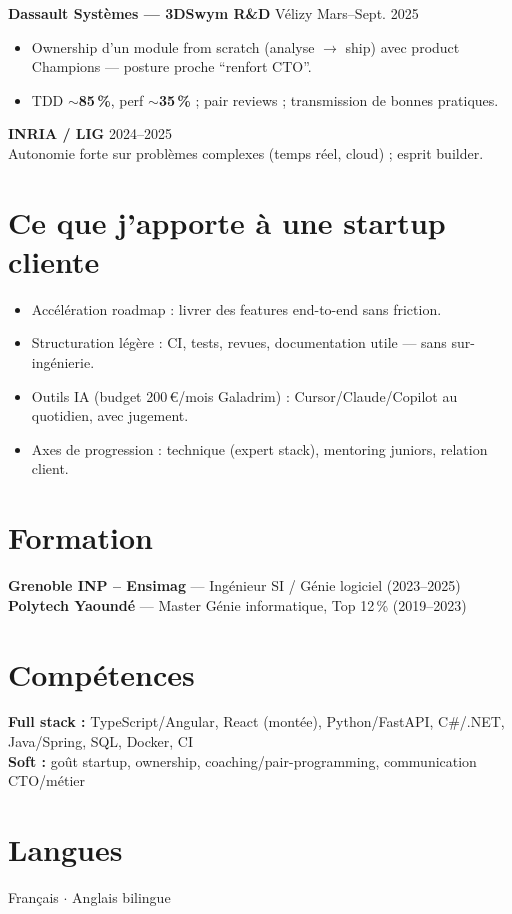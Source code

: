\documentclass[10pt,a4paper]{article}
\begin{document}
\textbf{Dassault Syst\`emes --- 3DSwym R\&D} \hfill V\'elizy \hfill Mars--Sept. 2025
\begin{itemize}
  \item Ownership d'un module from scratch (analyse $\rightarrow$ ship) avec product Champions --- posture proche ``renfort CTO''.
  \item TDD $\sim$\textbf{85\,\%}, perf $\sim$\textbf{35\,\%} ; pair reviews ; transmission de bonnes pratiques.
\end{itemize}

\textbf{INRIA / LIG} \hfill 2024--2025\\
Autonomie forte sur probl\`emes complexes (temps r\'eel, cloud) ; esprit builder.

\section{Ce que j'apporte \`a une startup cliente}
\begin{itemize}
  \item Acc\'el\'eration roadmap : livrer des features end-to-end sans friction.
  \item Structuration l\'eg\`ere : CI, tests, revues, documentation utile --- sans sur-ing\'enierie.
  \item Outils IA (budget 200\,€/mois Galadrim) : Cursor/Claude/Copilot au quotidien, avec jugement.
  \item Axes de progression : technique (expert stack), mentoring juniors, relation client.
\end{itemize}

\section{Formation}
\textbf{Grenoble INP -- Ensimag} --- Ing\'enieur SI / G\'enie logiciel (2023--2025)\\
\textbf{Polytech Yaound\'e} --- Master G\'enie informatique, Top 12\,\% (2019--2023)

\section{Comp\'etences}
\textbf{Full stack :} TypeScript/Angular, React (mont\'ee), Python/FastAPI, C\#/.NET, Java/Spring, SQL, Docker, CI\\
\textbf{Soft :} go\^ut startup, ownership, coaching/pair-programming, communication CTO/m\'etier

\section{Langues}
Fran\c{c}ais $\cdot$ Anglais bilingue
\end{document}
